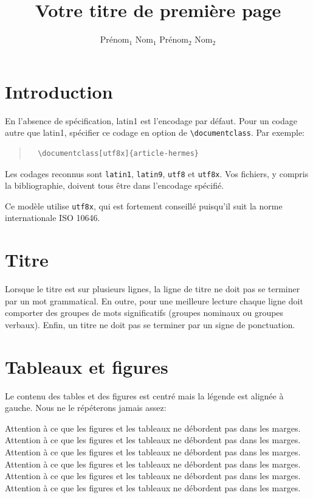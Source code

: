 \documentclass[utf8x]{article-hermes_frenchb}
\title[Titre court]{Votre titre de première page}
\author{Prénom$_1$ Nom$_1$\fup{*} \andauthor Prénom$_2$ Nom$_2$\fup{**}  }
\begin{document}
\maketitlepage

\newcommand{\fakesentence}{Attention à ce que les figures et les tableaux ne débordent pas dans les marges. }
\newcommand{\fakeparagraph}{
\fakesentence
\fakesentence
\fakesentence
\fakesentence
\fakesentence
\fakesentence
}

\newcommand{\TAL}{traitement automatique des langues}

\newcommand{\CAD}{c'est-à-dire}
\newcommand{\COLL}{et collègues}
\newcommand{\PEX}{par exemple}
\newcommand{\POPP}{par opposition à}

\newcommand{\cad}{c.-à-d.}
\newcommand{\coll}{et~coll.}
\newcommand{\pex}{p.~ex.}
\newcommand{\popp}{p.~opp.}


\section{Introduction}

En l'absence de spécification, latin1 est l'encodage par défaut. Pour un codage autre que latin1, spécifier ce codage en option de \verb$\documentclass$. Par exemple:
\begin{quote}
\begin{verbatim}
  \documentclass[utf8x]{article-hermes}
\end{verbatim}
\end{quote}
Les codages reconnus sont \texttt{latin1}, \texttt{latin9}, \texttt{utf8} et \texttt{utf8x}. Vos fichiers, y compris la bibliographie, doivent tous être dans l'encodage spécifié.

Ce modèle utilise \texttt{utf8x}, qui est fortement conseillé puisqu'il suit la norme internationale ISO 10646.

\section{Titre}
Lorsque le titre est sur plusieurs lignes, la ligne de titre ne doit pas se terminer par un mot grammatical. En outre, pour une meilleure lecture chaque ligne doit comporter des groupes de mots significatifs (groupes nominaux ou groupes verbaux). Enfin, un titre ne doit pas se terminer par un signe de ponctuation.

\section{Tableaux et figures}
Le contenu des tables et des figures est centré mais la légende est alignée à gauche.
Nous ne le répéterons jamais assez:
\fakeparagraph
\end{document}
